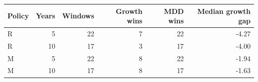 \begin{tabular}{@{}lrrrrr@{}}\toprule
Policy & Years & Windows & Growth wins & MDD wins & Median growth gap\\\midrule
R & 5 & 22 & 7 & 22 & -4.27\\
R & 10 & 17 & 3 & 17 & -4.00\\
M & 5 & 22 & 8 & 22 & -1.94\\
M & 10 & 17 & 8 & 17 & -1.63\\
\bottomrule
\end{tabular}
